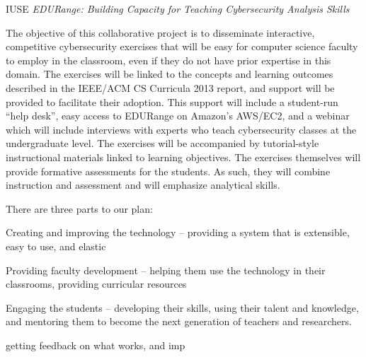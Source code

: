 \documentclass[11pt]{report}
\begin{document}
\begin{center} 
{\Large IUSE {\em EDURange: Building Capacity for Teaching Cybersecurity Analysis Skills}}
\end{center}

The objective of this collaborative project is to disseminate interactive, competitive 
cybersecurity exercises that will be easy for computer science faculty to employ in the 
classroom, even if they do not have prior expertise in this domain.  The exercises 
will be linked to the concepts and learning outcomes described in the 
IEEE/ACM CS Curricula 2013 report, and support will be provided
to facilitate their adoption.  This support will include a student-run ``help desk'',
easy access to EDURange on Amazon's AWS/EC2, and a webinar which will include interviews
with experts who teach cybersecurity classes at the undergraduate level.  The exercises
will be accompanied by  tutorial-style instructional materials linked to learning
objectives.  The exercises themselves will provide formative assessments for the 
students.  As such, they will combine instruction and assessment and will emphasize
analytical skills.

There are three parts to our plan:
\begin{packenum}
\item Creating and improving the technology -- providing a system that is extensible, 
  easy to use, and   elastic
\item Providing faculty development --  helping them use the technology in their classrooms, 
  providing curricular resources
\item Engaging the students -- developing their skills, using their talent and knowledge, 
  and mentoring them to become the next generation of teachers and researchers.
\end{packenum}
  getting feedback on what works, and imp

\end{document}

